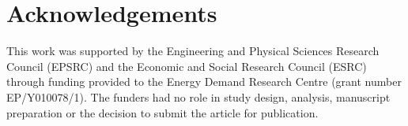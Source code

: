 \documentclass[lettersize,journal]{IEEEtran}
\begin{document}
\section*{Acknowledgements}
This work was supported by the Engineering and Physical Sciences Research Council (EPSRC) and the Economic and Social Research Council (ESRC) through funding provided to the Energy Demand Research Centre (grant number EP/Y010078/1). The funders had no role in study design, analysis, manuscript preparation or the decision to submit the article for publication.



\end{document}
